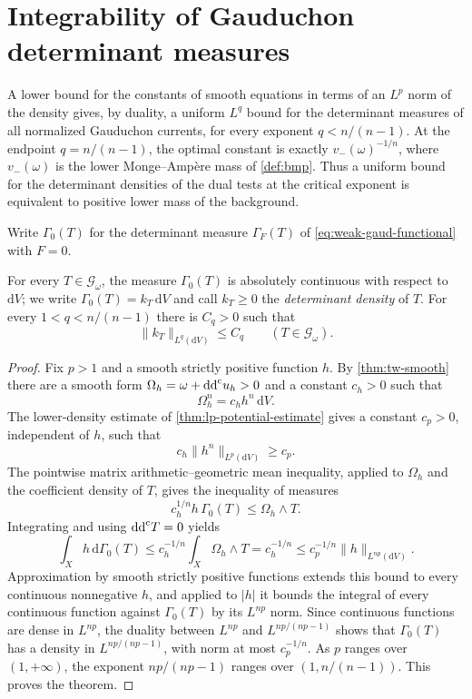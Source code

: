 \section{Integrability of Gauduchon determinant measures}
\label{sec:gaud-determinant-integrability}

A lower bound for the constants of smooth equations in terms of an $L^p$ norm of the density gives, by duality, a uniform $L^q$ bound for the determinant measures of all normalized Gauduchon currents, for every exponent $q<n/(n-1)$. At the endpoint $q=n/(n-1)$, the optimal constant is exactly $v_-(\omega)^{-1/n}$, where $v_-(\omega)$ is the lower Monge--Amp\`ere mass of \cref{def:bmp}. Thus a uniform bound for the determinant densities of the dual tests at the critical exponent is equivalent to positive lower mass of the background.

Write $\Gamma_0(T)$ for the determinant measure $\Gamma_F(T)$ of \eqref{eq:weak-gaud-functional} with $F=0$.

\begin{theorem}\label{thm:gaud-determinant-subcritical}
For every $T\in\mathscr G_\omega$, the measure $\Gamma_0(T)$ is absolutely continuous with respect to $\mathrm{d}V$; we write $\Gamma_0(T)=k_T\,\mathrm{d}V$ and call $k_T\geq0$ the \emph{determinant density} of $T$. For every $1<q<n/(n-1)$ there is $C_q>0$ such that
\[
 \|k_T\|_{L^q(\mathrm{d}V)}\leq C_q
 \qquad(T\in\mathscr G_\omega).
\]
\end{theorem}
\begin{proof}
Fix $p>1$ and a smooth strictly positive function $h$. By \cref{thm:tw-smooth} there are a smooth form $\Omega_h=\omega+\mathrm{dd}^{\mathrm{c}} u_h>0$ and a constant $c_h>0$ such that
\[
 \Omega_h^n=c_hh^n\,\mathrm{d}V.
\]
The lower-density estimate of \cref{thm:lp-potential-estimate} gives a constant $c_p>0$, independent of $h$, such that
\[
 c_h\|h^n\|_{L^p(\mathrm{d}V)}\geq c_p.
\]
The pointwise matrix arithmetic--geometric mean inequality, applied to $\Omega_h$ and the coefficient density of $T$, gives the inequality of measures
\[
 c_h^{1/n}h\,\Gamma_0(T)\leq\Omega_h\wedge T.
\]
Integrating and using $\mathrm{dd}^{\mathrm{c}} T=0$ yields
\[
 \int_Xh\,\mathrm{d}\Gamma_0(T)
 \leq c_h^{-1/n}\int_X\Omega_h\wedge T
 =c_h^{-1/n}
 \leq c_p^{-1/n}\|h\|_{L^{np}(\mathrm{d}V)}.
\]
Approximation by smooth strictly positive functions extends this bound to every continuous nonnegative $h$, and applied to $|h|$ it bounds the integral of every continuous function against $\Gamma_0(T)$ by its $L^{np}$ norm. Since continuous functions are dense in $L^{np}$, the duality between $L^{np}$ and $L^{np/(np-1)}$ shows that $\Gamma_0(T)$ has a density in $L^{np/(np-1)}$, with norm at most $c_p^{-1/n}$. As $p$ ranges over $(1,+\infty)$, the exponent $np/(np-1)$ ranges over $(1,n/(n-1))$. This proves the theorem.
\end{proof}

